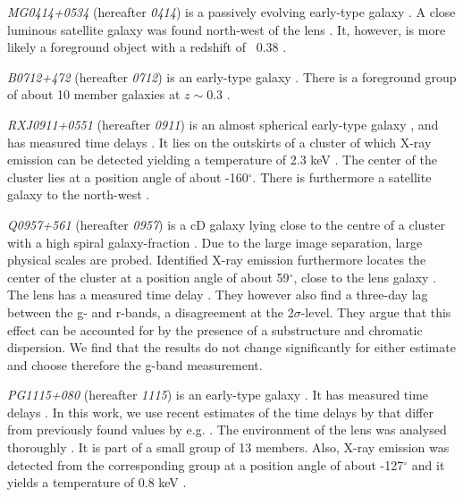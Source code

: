 \documentclass[useAMS,usenatbib]{mn2e}
\begin{document}
\textit{MG0414+0534} (hereafter \textit{0414}) is a passively evolving early-type galaxy \citep{1999AJ....117.2034T}. A close luminous satellite galaxy was found north-west of the lens \citep{1993AJ....105....1S}. It, however, is more likely a foreground object with a redshift of ~0.38 \citep{2011MNRAS.413L..86C}.

\textit{B0712+472} (hereafter \textit{0712}) is an early-type galaxy \citep{1998MNRAS.296..483J,1998AJ....115..377F}. There is a foreground group of about 10 member galaxies at $z\sim0.3$ \citep{2002AJ....123..627F}.

\textit{RXJ0911+0551} (hereafter \textit{0911}) is an almost spherical early-type galaxy \citep{1997A&A...317L..13B,2012A&A...538A..99S}, and has measured time delays \citep{2002ApJ...572L..11H}. It lies on the outskirts of a cluster of which X-ray emission can be detected yielding a temperature of 2.3 keV \citep{2001ApJ...555....1M}. The center of the cluster lies at a position angle of about -160$^{\circ}$. There is furthermore a satellite galaxy to the north-west \citep{2000ApJ...544L..35K}.

\textit{Q0957+561} (hereafter \textit{0957}) is a cD galaxy lying close to the centre of a cluster with a high spiral galaxy-fraction \citep[e.g.][]{1992MNRAS.254P..27G,1994A&A...291..411A,1998ApJ...504..661C}. Due to the large image separation, large physical scales are probed. Identified X-ray emission furthermore locates the center of the cluster at a position angle of about 59$^{\circ}$, close to the lens galaxy \citep{2002ApJ...565...96C}. The lens has a measured time delay \citep[e.g.][]{2012A&A...540A.132S}. They however also find a three-day lag between the g- and r-bands, a disagreement at the 2$\sigma$-level. They argue that this effect can be accounted for by the presence of a substructure and chromatic dispersion. We find that the results do not change significantly for either estimate and choose therefore the g-band measurement.

\textit{PG1115+080} (hereafter \textit{1115}) is an early-type galaxy \citep{1980Natur.285..641W,2005ApJ...626...51Y}. It has measured time delays \citep[see e.g.][]{1997ApJ...475L..85S}. In this work, we use recent estimates of the time delays by \citet{2010MNRAS.406.2764T} that differ from previously found values by e.g. \citet{1997ApJ...489...21B}. The environment of the lens was analysed thoroughly \citep{2006ApJ...641..169M,2011ApJ...726...84W}. It is part of a small group of 13 members. Also, X-ray emission was detected from the corresponding group at a position angle of about -127$^{\circ}$ and it yields a temperature of 0.8 keV \citep{2004ApJ...610..686G}.
\end{document}
